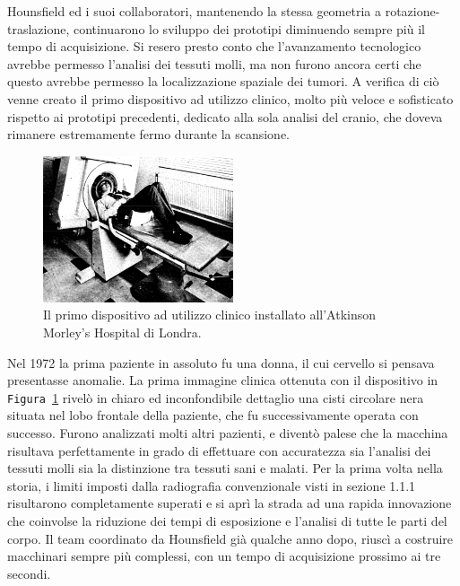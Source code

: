 \documentclass[a4paper,11pt, oneside]{article}
\begin{document}
                        Hounsfield ed i suoi collaboratori, mantenendo la stessa geometria a rotazione-traslazione, continuarono lo sviluppo dei prototipi diminuendo sempre più il tempo di acquisizione. Si resero presto conto che l'avanzamento tecnologico avrebbe permesso l'analisi dei tessuti molli, ma non furono ancora certi che questo avrebbe permesso la localizzazione spaziale dei tumori. A verifica di ciò venne creato il primo dispositivo ad utilizzo clinico, molto più veloce e sofisticato rispetto ai prototipi precedenti, dedicato alla sola analisi del cranio, che doveva rimanere estremamente fermo durante la scansione.
                        
                        \begin{figure}[h]
                            \centering
                            \includegraphics[width=0.5\textwidth]{clinical}
                            \caption{Il primo dispositivo ad utilizzo clinico installato all'Atkinson Morley’s Hospital di Londra.}
                            \label{fig:clinical}
                        \end{figure}
                        
                        Nel 1972 la prima paziente in assoluto fu una donna, il cui cervello si pensava presentasse anomalie. La prima immagine clinica ottenuta con il dispositivo in \texttt{Figura \ref{fig:clinical}} rivelò in chiaro ed inconfondibile dettaglio una cisti circolare nera situata nel lobo frontale della paziente, che fu successivamente operata con successo. Furono analizzati molti altri pazienti, e diventò palese che la macchina risultava perfettamente in grado di effettuare con accuratezza sia l'analisi dei tessuti molli sia la distinzione tra tessuti sani e malati\cite{hounsfield-nobel-lecture}.
                        Per la prima volta nella storia, i limiti imposti dalla radiografia convenzionale visti in sezione 1.1.1 risultarono completamente superati e si aprì la strada ad una rapida innovazione che coinvolse la riduzione dei tempi di esposizione e l'analisi di tutte le parti del corpo. Il team coordinato da Hounsfield già qualche anno dopo, riuscì a costruire macchinari sempre più complessi, con un tempo di acquisizione prossimo ai tre secondi.
                        
\end{document}
